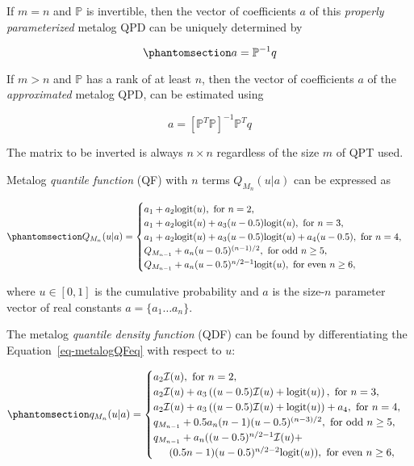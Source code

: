 \documentclass[
  letterpaper,
  DIV=11,
  numbers=noendperiod]{scrartcl}
\begin{document}
If \(m=n\) and \(\mathbb{P}\) is invertible, then the vector of
coefficients \(a\) of this \emph{properly parameterized} metalog QPD can
be uniquely determined by

\begin{equation}\phantomsection\label{eq-nmetalogAsMatrixeq}{
a=\mathbb{P}^{-1}q
}\end{equation}

If \(m > n\) and \(\mathbb{P}\) has a rank of at least \(n\), then the
vector of coefficients \(a\) of the \emph{approximated} metalog QPD, can
be estimated using

\[
a=[\mathbb{P}^T\mathbb{P}]^{-1}\mathbb{P}^Tq
\]

The matrix to be inverted is always \(n \times n\) regardless of the
size \(m\) of QPT used.

Metalog \emph{quantile function} (QF) with \(n\) terms
\(Q_{M_n}(u\vert a)\) can be expressed as

\begin{equation}\phantomsection\label{eq-metalogQFeq}{
Q_{M_n}(u\vert a)=\begin{cases}
a_1+a_2\text{logit}(u), \text{ for } n=2, \\
a_1+a_2\text{logit}(u)+a_3(u-0.5)\text{logit}(u), \text{ for } n=3, \\
a_1+a_2\text{logit}(u)+a_3(u-0.5)\text{logit}(u)+a_4(u-0.5), \text{ for } n=4, \\
Q_{M_{n-1}} + a_n(u-0.5)^{(n-1)/2}, \text{ for odd } n \geq 5, \\
Q_{M_{n-1}} + a_n(u-0.5)^{n/2-1}\text{logit}(u), \text{ for even } n \geq 6, \\
\end{cases}
}\end{equation}

where \(u \in [0,1]\) is the cumulative probability and \(a\) is the
size-\(n\) parameter vector of real constants \(a=\{a_1\dots a_n\}\).

The metalog \emph{quantile density function} (QDF) can be found by
differentiating the Equation~\ref{eq-metalogQFeq} with respect to \(u\):

\begin{equation}\phantomsection\label{eq-metalogQDFeq}{
\begin{gathered}
q_{M_n}(u\vert a)=\begin{cases}
a_2\mathcal I(u), \text{ for } n=2, \\
a_2\mathcal I(u)+a_3\left((u-0.5)\mathcal I(u)+\text{logit}(u) \right), \text{ for } n=3, \\
a_2\mathcal I(u) + a_3\left((u-0.5)\mathcal I(u)+\text{logit}(u) \right)+ a_4,  \text{ for } n=4, \\
q_{M_{n-1}} + 0.5a_n(n-1)(u-0.5)^{(n-3)/2}, \text{ for odd } n \geq 5, \\
q_{M_{n-1}} + a_n((u-0.5)^{n/2-1}\mathcal I(u)+\\ \indent (0.5n-1)(u-0.5)^{n/2-2}\text{logit}(u)), \text{ for even } n \geq 6, \\
\end{cases}
\end{gathered}
}\end{equation}
\end{document}
